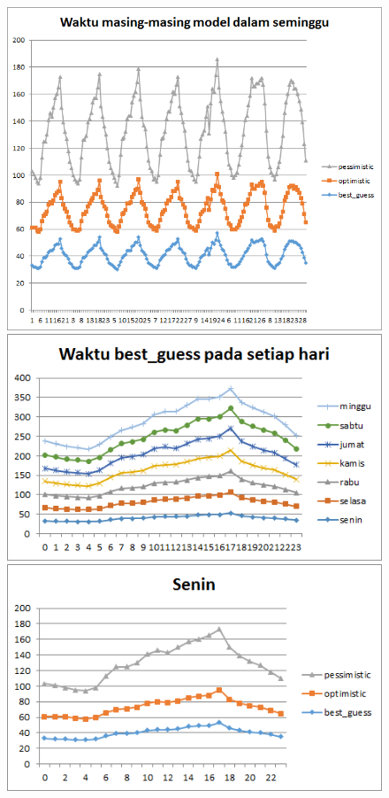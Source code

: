 \begin{figure}[H]
				\centering		
				\includegraphics[scale=0.8]{Gambar/waktuallmodelsampel115052017.png}
				\includegraphics[]{Gambar/waktubestguesssampel115052017.png}
				\includegraphics[]{Gambar/seninsampel115052017.png}
\end{figure}
			
